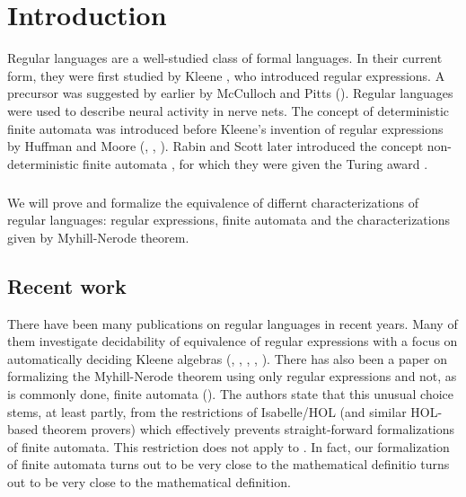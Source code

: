\chapter{Introduction}
\label{chap:intro}

Regular languages are a well-studied class of formal languages. 
In their current form, they were first studied by Kleene \cite{KleeneNets}, who introduced regular expressions. 
A precursor \cite{Gruber} was suggested by earlier by McCulloch and Pitts (\cite{McCulloch}).
Regular languages were used to describe neural activity in nerve nets.
The concept of deterministic finite automata was introduced before Kleene's invention of regular expressions by Huffman and Moore (\cite{Huffman1}, \cite{Huffman2}, \cite{Moore}). 
Rabin and Scott later introduced the concept non-deterministic finite automata \cite{RabinScott}, for which they were given the Turing award \cite{Ashenhurst:1987:ATA:27609}.

\paragraph{}
We will prove and formalize the equivalence of differnt characterizations of regular languages: regular expressions, finite automata and the characterizations given by Myhill-Nerode theorem.



\section{Recent work}

There have been many publications on regular languages in recent years.
Many of them investigate decidability of equivalence of regular expressions with a focus on automatically deciding Kleene algebras (\cite{DBLP:conf/cpp/CoquandS11}, \cite{DBLP:conf/itp/Asperti12}, \cite{DBLP:journals/jar/KraussN12}, \cite{DBLP:journals/corr/abs-1105-4537}, \cite{DBLP:conf/RelMiCS/MoreiraPS12}). 
There has also been a paper on formalizing the Myhill-Nerode theorem using only regular expressions and not, as is commonly done, finite automata (\cite{DBLP:conf/itp/2011}).
The authors state that this unusual choice stems, at least partly, from the restrictions of Isabelle/HOL (and similar HOL-based theorem provers) which effectively prevents straight-forward formalizations of finite automata. 
This restriction does not apply to \coq. 
In fact, our formalization of finite automata turns out to be very close to the mathematical definitio turns out to be very close to the mathematical definition.

